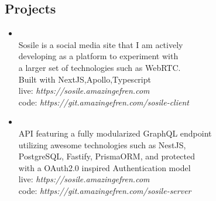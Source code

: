 \documentclass[11pt,oneside,a4paper,titlepage]{article}
\begin{document}
\begin{tcolorbox}
\begin{minipage}[t]{10cm}
\begin{tcolorbox}[grow to right by=1cm,colframe=white,colback=white]
      \section*{Projects}
      \vspace{-0.2cm}
      \begin{itemize}
        \item{
            {{}}
            \vspace{0.1cm}\\
             Sosile is a social media site that I am actively \\
             developing as a platform to experiment with\\
             a larger set of technologies such as WebRTC.\\
             Built with {{NextJS}},{{Apollo}},{{Typescript}}\\
             \small{live: \emph{\textcolor{themeBase}{https://sosile.amazingefren.com}}}\\
             \small{code: \emph{\textcolor{themeBase}{https://git.amazingefren.com/sosile-client}}}
          }
        \item{
            {{}}
            \vspace{0.1cm}\\
            API featuring a fully modularized {{GraphQL}} endpoint\\
            utilizing awesome technologies such as {{NestJS}},\\
            {{PostgreSQL}}, {{Fastify}}, {{PrismaORM}}, and protected\\
            with a {{OAuth2.0}} inspired Authentication model\\
           \small{live: \emph{\textcolor{themeBase}{https://sosile.amazingefren.com}}}\\
           \small{code: \emph{\textcolor{themeBase}{https://git.amazingefren.com/sosile-server}}}
          }
      \end{itemize}

      \vspace{-0.6cm}

\end{tcolorbox}
\end{minipage}
\end{tcolorbox}
\end{document}
